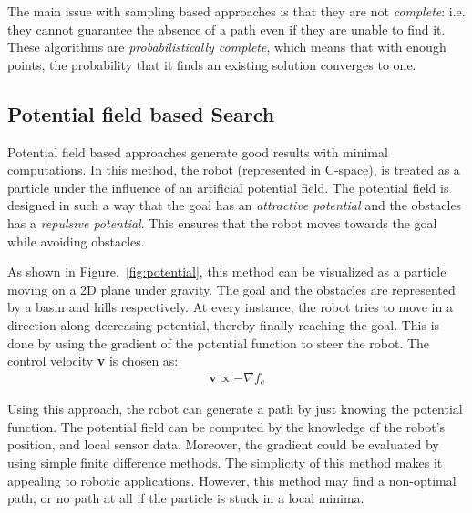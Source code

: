 The main issue with sampling based approaches is that they are not \textit{complete}: i.e. they cannot guarantee the absence of a path even if they are unable to find it. These algorithms are \textit{probabilistically complete}, which means that with enough points, the probability that it finds an existing solution converges to one.
\subsection{Potential field based Search}
\label{sec:pot_search}
Potential field based approaches generate good results with minimal computations. In this method, the robot (represented in C-space), is treated as a particle under the influence of an artificial potential field. The potential field is designed in such a way that the goal has an \textit{attractive potential} and the obstacles has a \textit{repulsive potential}. This ensures that the robot moves towards the goal while avoiding obstacles. 

As shown in Figure.~\ref{fig:potential}, this method can be visualized as a particle moving on a 2D plane under gravity. The goal and the obstacles are represented by a basin and hills respectively. At every instance, the robot tries to move in a direction along decreasing potential, thereby finally reaching the goal. This is done by using the gradient of the potential function to steer the robot. The control velocity \textbf{v} is chosen as:
\begin{align}
\textbf{v} \propto -\nabla f_c
\end{align}

Using this approach, the robot can generate a path by just knowing the potential function. The potential field can be computed by the knowledge of the robot's position, and local sensor data. Moreover, the gradient could be evaluated by using simple finite difference methods. The simplicity of this method makes it appealing to robotic applications. However, this method may find a non-optimal path, or no path at all if the particle is stuck in a local minima.


